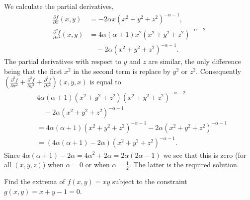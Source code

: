 \begin{solution}
    We calculate the partial derivatives,
    \[
        \begin{aligned}
            \tfrac{\partial f}{\partial x}(x,y)
             & = -2 \alpha x{(x^2 + y^2 + z^2)}^{-\alpha-1},           \\
            \tfrac{\partial^2 f}{\partial x^2}(x,y)
             & = 4 \alpha(\alpha+1) x^2{(x^2 + y^2 + z^2)}^{-\alpha-2} \\
             & \quad -2 \alpha {(x^2 + y^2 + z^2)}^{-\alpha-1}.
        \end{aligned}
    \]
    The partial derivatives with respect to \(y\) and \(z\) are similar, the only difference being that the first \(x^2\) in the second term is replace by \(y^2\) or \(z^2\).
    Consequently \(\left(\tfrac{\partial^2 f}{\partial x^2} + \tfrac{\partial^2 f}{\partial y^2}  +\tfrac{\partial^2 f}{\partial z^2}\right)(x,y,x)\) is equal to
    \[
        \begin{aligned}
             & 4 \alpha(\alpha+1)( x^2 + y^2 + z^2){(x^2 + y^2 + z^2)}^{-\alpha-2} \\
             & \quad -2 \alpha {(x^2 + y^2 + z^2)}^{-\alpha-1}                     \\
             & =  4 \alpha(\alpha+1){(x^2 + y^2 + z^2)}^{-\alpha-1}               %
              -2 \alpha {(x^2 + y^2 + z^2)}^{-\alpha-1}                     \\
             & = (4 \alpha(\alpha+1) -2 \alpha ) {(x^2 + y^2 + z^2)}^{-\alpha-1}.
        \end{aligned}
    \]
    Since \(4 \alpha(\alpha+1) -2 \alpha = 4\alpha^2 + 2\alpha = 2\alpha(2\alpha -1)\) we see that this is zero (for all \((x,y,z)\)) when \(\alpha=0\) or when \(\alpha = \frac{1}{2}\).
    The latter is the required solution.
\end{solution}


\begin{task}
    Find the extrema of \(f(x,y) = xy\) subject to the constraint \(g(x,y) = x+y-1 =0\).
\end{task}

